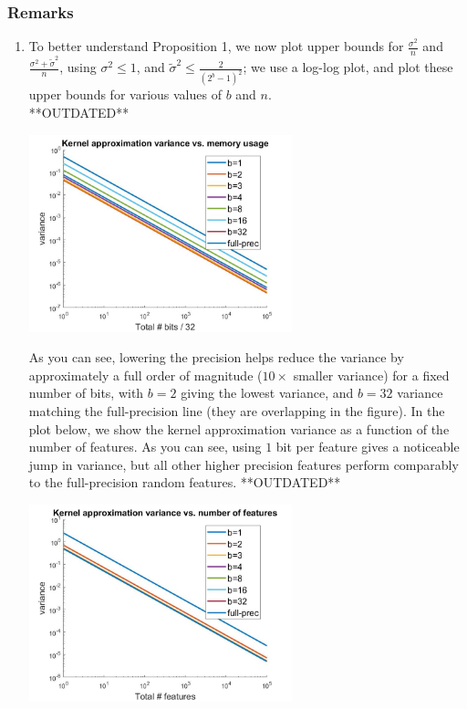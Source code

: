 \documentclass[12pt]{article}
\newcommand{\tsigma}{\tilde{\sigma}}
\begin{document}
\subsubsection{Remarks}
\begin{enumerate}
\item To better understand Proposition 1, we now plot upper bounds for $\frac{\sigma^2}{n}$ and $\frac{\sigma^2 + \tsigma^2}{n}$, using $\sigma^2\leq 1$, and $\tsigma^2 \leq  \frac{2}{(2^b-1)^2}$; we use a log-log plot, and plot these upper bounds for various values of $b$ and $n$.\\
**OUTDATED**
\begin{center}
	\includegraphics[width=0.6\textwidth]{lprff_variance_figure_numbits.jpg}
\end{center}
As you can see, lowering the precision helps reduce the variance by approximately a full order of magnitude ($10\times$ smaller variance) for a fixed number of bits, with $b=2$ giving the lowest variance, and $b=32$ variance matching the full-precision line (they are overlapping in the figure).  In the plot below, we show the kernel approximation variance as a function of the number of features.  As you can see, using $1$ bit per feature gives a noticeable jump in variance, but all other higher precision features perform comparably to the full-precision random features.
**OUTDATED**
\begin{center}
	\includegraphics[width=0.6\textwidth]{lprff_variance_figure_numfeat.jpg}

\end{center}
\end{enumerate}
\end{document}
